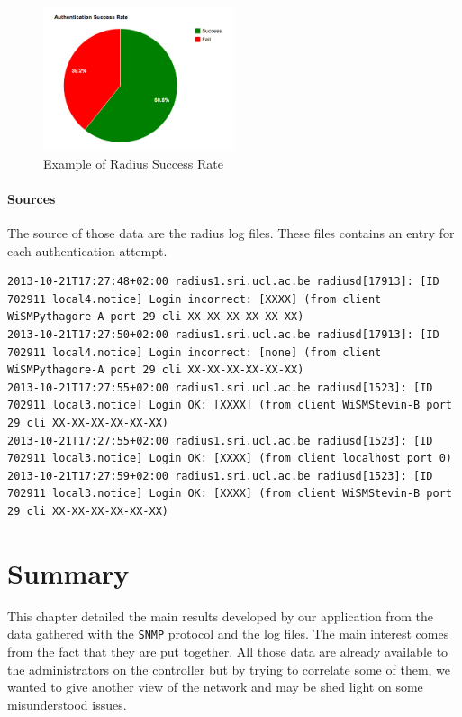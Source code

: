 \begin{figure}[H]
	\centering
   \includegraphics[width=0.5\textwidth]{Pictures/chapter5/radiusRate.png}
   \caption{Example of Radius Success Rate}
\end{figure} 

\paragraph*{Sources} The source of those data are the radius log files. These files contains an entry for each authentication attempt.

\begin{lstlisting}[frame=single,breaklines=true,caption={Radius logs}]
2013-10-21T17:27:48+02:00 radius1.sri.ucl.ac.be radiusd[17913]: [ID 702911 local4.notice] Login incorrect: [XXXX] (from client WiSMPythagore-A port 29 cli XX-XX-XX-XX-XX-XX)
2013-10-21T17:27:50+02:00 radius1.sri.ucl.ac.be radiusd[17913]: [ID 702911 local4.notice] Login incorrect: [none] (from client WiSMPythagore-A port 29 cli XX-XX-XX-XX-XX-XX)
2013-10-21T17:27:55+02:00 radius1.sri.ucl.ac.be radiusd[1523]: [ID 702911 local3.notice] Login OK: [XXXX] (from client WiSMStevin-B port 29 cli XX-XX-XX-XX-XX-XX)
2013-10-21T17:27:55+02:00 radius1.sri.ucl.ac.be radiusd[1523]: [ID 702911 local3.notice] Login OK: [XXXX] (from client localhost port 0)
2013-10-21T17:27:59+02:00 radius1.sri.ucl.ac.be radiusd[1523]: [ID 702911 local3.notice] Login OK: [XXXX] (from client WiSMStevin-B port 29 cli XX-XX-XX-XX-XX-XX)
\end{lstlisting}

\section{Summary}
This chapter detailed the main results developed by our application from the data gathered with the \texttt{SNMP} protocol and the log files. The main interest comes from the fact that they are put together. All those data are already available to the administrators on the controller but by trying to correlate some of them, we wanted to give another view of the network and may be shed light on some misunderstood issues. 


